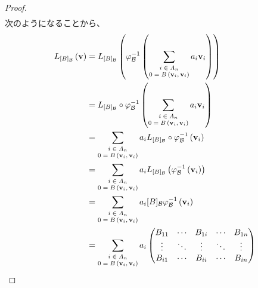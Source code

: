 \documentclass[dvipdfmx]{jsarticle}
\begin{document}
\begin{proof}
\begin{align*}
\end{align*}
次のようになることから、
\begin{align*}
L_{[ B]_{\mathcal{B}}}\left( \mathbf{v} \right) &= L_{[ B]_{\mathcal{B}}}\left( \varphi_{\mathcal{B}}^{- 1}\left( \sum_{\scriptsize \begin{matrix} i \in \varLambda_{n} \\0 = B\left( \mathbf{v}_{i},\mathbf{v}_{i} \right) \end{matrix}} {a_{i}\mathbf{v}_{i}} \right) \right)\\
&= L_{[ B]_{\mathcal{B}}} \circ \varphi_{\mathcal{B}}^{- 1}\left( \sum_{\scriptsize \begin{matrix} i \in \varLambda_{n} \\0 = B\left( \mathbf{v}_{i},\mathbf{v}_{i} \right) \end{matrix}} {a_{i}\mathbf{v}_{i}} \right)\\
&= \sum_{\scriptsize \begin{matrix} i \in \varLambda_{n} \\0 = B\left( \mathbf{v}_{i},\mathbf{v}_{i} \right) \end{matrix}} {a_{i}L_{[ B]_{\mathcal{B}}} \circ \varphi_{\mathcal{B}}^{- 1}\left( \mathbf{v}_{i} \right)}\\
&= \sum_{\scriptsize \begin{matrix} i \in \varLambda_{n} \\0 = B\left( \mathbf{v}_{i},\mathbf{v}_{i} \right) \end{matrix}} {a_{i}L_{[ B]_{\mathcal{B}}}\left( \varphi_{\mathcal{B}}^{- 1}\left( \mathbf{v}_{i} \right) \right)}\\
&= \sum_{\scriptsize \begin{matrix} i \in \varLambda_{n} \\0 = B\left( \mathbf{v}_{i},\mathbf{v}_{i} \right) \end{matrix}} {a_{i}[ B]_{\mathcal{B}}\varphi_{\mathcal{B}}^{- 1}\left( \mathbf{v}_{i} \right)}\\
&= \sum_{\scriptsize \begin{matrix} i \in \varLambda_{n} \\0 = B\left( \mathbf{v}_{i},\mathbf{v}_{i} \right) \end{matrix}} {a_{i}\begin{pmatrix}
B_{11} & \cdots & B_{1i} & \cdots & B_{1n} \\
 \vdots & \ddots & \vdots & \ddots & \vdots \\
B_{i1} & \cdots & B_{ii} & \cdots & B_{in} \\

\end{pmatrix}}
\end{align*}
\end{proof}
\end{document}

